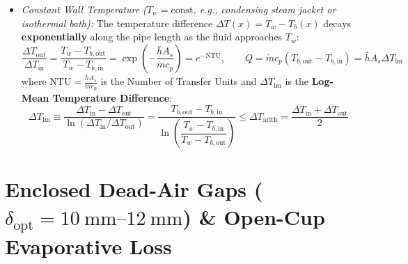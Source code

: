 \begin{enumerate}
\begin{itemize}
    \item \emph{Constant Wall Temperature ($T_w = \mathrm{const}$, e.g., condensing steam jacket or isothermal bath):} The temperature difference $\Delta T(x) = T_w - T_b(x)$ decays \textbf{exponentially} along the pipe length as the fluid approaches $T_w$:
    \begin{equation}
      \frac{\Delta T_{\mathrm{out}}}{\Delta T_{\mathrm{in}}} = \frac{T_w - T_{b,\mathrm{out}}}{T_w - T_{b,\mathrm{in}}} = \exp\!\left(-\frac{\bar{h} A_s}{\dot{m} c_p}\right) = e^{-\mathrm{NTU}}, \qquad \dot{Q} = \dot{m} c_p\left(T_{b,\mathrm{out}} - T_{b,\mathrm{in}}\right) = \bar{h} A_s \Delta T_{\mathrm{lm}}
      \label{eq:11:pipe-lmtd}
    \end{equation}
    where $\mathrm{NTU} = \frac{\bar{h}A_s}{\dot{m}c_p}$ is the Number of Transfer Units and $\Delta T_{\mathrm{lm}}$ is the \textbf{Log-Mean Temperature Difference}:
    \begin{equation}
      \boxed{\Delta T_{\mathrm{lm}} \equiv \frac{\Delta T_{\mathrm{in}} - \Delta T_{\mathrm{out}}}{\ln\!\left(\Delta T_{\mathrm{in}} / \Delta T_{\mathrm{out}}\right)} = \frac{T_{b,\mathrm{out}} - T_{b,\mathrm{in}}}{\ln\!\left(\dfrac{T_w - T_{b,\mathrm{in}}}{T_w - T_{b,\mathrm{out}}}\right)} \le \Delta T_{\mathrm{arith}} = \frac{\Delta T_{\mathrm{in}} + \Delta T_{\mathrm{out}}}{2}}
      \label{eq:11:lmtd-boxed}
    \end{equation}
  \end{itemize}
\end{enumerate}

\section{Enclosed Dead-Air Gaps ($\delta_{\mathrm{opt}} = \SIrange{10}{12}{\milli\meter}$) \& Open-Cup Evaporative Loss}
\label{sec:11.3}

